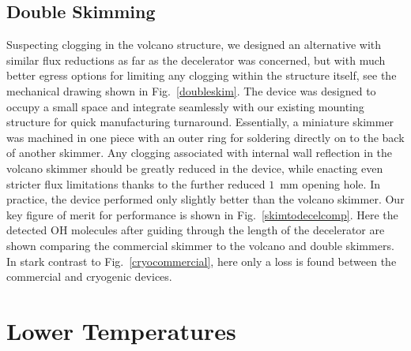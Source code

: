 \subsection{Double Skimming}


Suspecting clogging in the volcano structure, we designed an alternative with similar flux reductions as far as the decelerator was concerned, but with much better egress options for limiting any clogging within the structure itself, see the mechanical drawing shown in Fig.~\ref{doubleskim}.
The device was designed to occupy a small space and integrate seamlessly with our existing mounting structure for quick manufacturing turnaround.
Essentially, a miniature skimmer was machined in one piece with an outer ring for soldering directly on to the back of another skimmer.
Any clogging associated with internal wall reflection in the volcano skimmer should be greatly reduced in the device, while enacting even stricter flux limitations thanks to the further reduced $1$~mm opening hole.
In practice, the device performed only slightly better than the volcano skimmer.
Our key figure of merit for performance is shown in Fig.~\ref{skimtodecelcomp}.
Here the detected OH molecules after guiding through the length of the decelerator are shown comparing the commercial skimmer to the volcano and double skimmers.
In stark contrast to Fig.~\ref{cryocommercial}, here only a loss is found between the commercial and cryogenic devices.


\section{Lower Temperatures}

